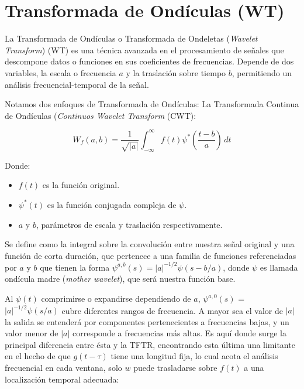 \newpage

\section{Transformada de Ondículas (WT)}

La Transformada de Ondículas o Transformada de Ondeletas (\textit{Wavelet Transform}) (WT) es una técnica avanzada en el procesamiento de señales que descompone datos o funciones en sus coeficientes de frecuencias. Depende de dos variables, la escala o frecuencia $a$ y la traslación sobre tiempo $b$, permitiendo un análisis frecuencial-temporal de la señal.

Notamos dos enfoques de Transformada de Ondículas: La Transformada Continua de Ondículas (\textit{Continuos Wavelet Transform} (CWT): 

\[
W_{f}(a, b) = \frac{1}{\sqrt{|a|}} \int_{-\infty}^{\infty} f(t) \psi^{*} \left(\frac{t-b}{a}\right) \, dt
\]

Donde:
\begin{itemize}
  \item \( f(t) \) es la función original.
  \item \( \psi^{*}(t) \) es la función conjugada compleja de \( \psi \).
  \item \( a \) y \( b \), parámetros de escala y traslación respectivamente.
\end{itemize}

Se define como la integral sobre la convolución entre nuestra señal original y una función de corta duración, que pertenece a una familia de funciones referenciadas por $a$ y $b$ que tienen la forma $\psi^{a,b}(s) = |a|^{-1/2}\psi(s-b/a)$, donde $\psi$ es llamada ondícula madre (\textit{mother wavelet}), que será nuestra función base.

Al \( \psi(t) \) comprimirse o expandirse dependiendo de $a$, $\psi^{a,0}(s)$ = $|a|^{-1/2}\psi(s/a)$ cubre diferentes rangos de frecuencia. A mayor sea el valor de $|a|$ la salida se entenderá por componentes pertenecientes a frecuencias bajas, y un valor menor de $|a|$ corresponde a frecuencias más altas. Es aquí donde surge la principal diferencia entre ésta y la TFTR, encontrando esta última una limitante en el hecho de que $g(t-\tau)$ tiene una longitud fija, lo cual acota el análisis frecuencial en cada ventana, solo $w$ puede trasladarse sobre $f(t)$ a una localización temporal adecuada:

